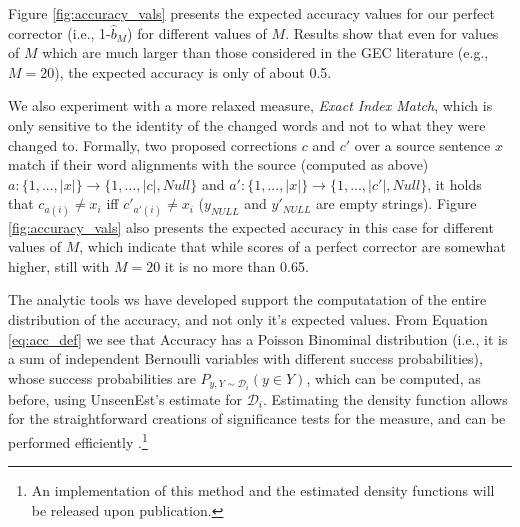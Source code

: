 \documentclass[letter,11pt]{article}
\newcommand{\lc}[1]{\footnote{\color{green}LC: #1}}
\begin{document}
Figure \ref{fig:accuracy_vals} presents the expected accuracy values for our perfect
corrector (i.e., 1-$\hat{b}_M$) for different values of $M$. 
Results show that even for values of $M$ which are much larger than
those considered in the GEC literature (e.g., $M=20$), the expected accuracy is only of about 0.5.

We also experiment with a more relaxed measure, {\it Exact Index Match}, which is only sensitive
to the identity of the changed words and not to what they were changed to.
Formally, two proposed corrections $c$ and $c'$ over a source sentence $x$ match
if their word alignments with the source (computed as above) $a:\{1,...,|x|\} \rightarrow \{1,...,\left|c\right|,Null\}$
and $a':\{1,...,\left|x\right|\} \rightarrow \{1,...,\left|c'\right|,Null\}$, it holds that $c_{a\left(i\right)} \neq x_{i}$ iff $c'_{a'\left(i\right)} \neq x_{i}$ ($y_{NULL}$ and $y'_{NULL}$ are empty strings).
Figure \ref{fig:accuracy_vals} also presents the expected accuracy in this case
for different values of $M$, which indicate that while scores of a perfect corrector are somewhat higher,
still with $M=20$ it is no more than 0.65.

	

The analytic tools ws have developed support the computatation of the entire distribution of the accuracy,
and not only it's expected values. From Equation \ref{eq:acc_def} we see that Accuracy has a Poisson Binominal distribution (i.e., it is a sum of independent Bernoulli variables with different success probabilities), whose success probabilities are $P_{y,Y \sim \mathcal{D}_i}(y \in Y)$, which can be computed, as before, using {\sc UnseenEst}'s estimate for $\mathcal{D}_i$. Estimating the density function allows for the straightforward creations of significance tests for the measure, and can be performed efficiently \cite{hong2013computing}.\footnote{An implementation of this method and the estimated density functions will be released upon publication.}
\end{document}

